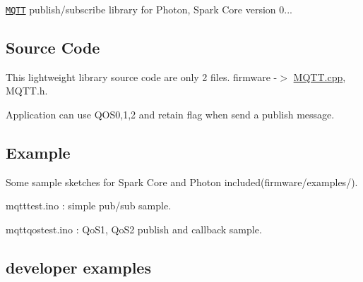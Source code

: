 \href{http://mqtt.org/}{\tt M\+Q\+TT} publish/subscribe library for Photon, Spark Core version 0...

\subsection*{Source Code}

This lightweight library source code are only 2 files. firmware -\/$>$ \hyperlink{_m_q_t_t_8cpp}{M\+Q\+T\+T.\+cpp}, M\+Q\+T\+T.\+h.

Application can use Q\+O\+S0,1,2 and retain flag when send a publish message.

\subsection*{Example}

Some sample sketches for Spark Core and Photon included(firmware/examples/).
\begin{DoxyItemize}
\item mqtttest.\+ino \+: simple pub/sub sample.
\item mqttqostest.\+ino \+: Qo\+S1, Qo\+S2 publish and callback sample.
\end{DoxyItemize}

\subsection*{developer examples}


